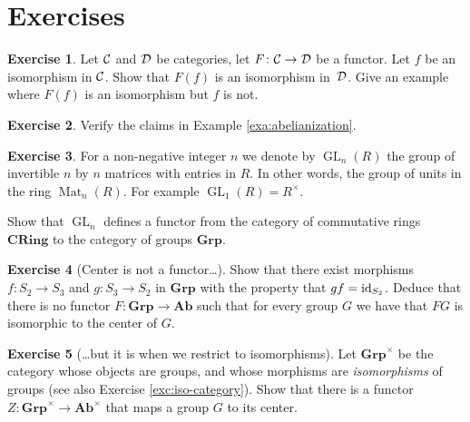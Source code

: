 \documentclass[11pt]{amsbook}
\DeclareMathOperator\GL{GL}
\DeclareMathOperator\Mat{Mat}
\def\id{{\rm id}}
\def\Ab{\mathbf{Ab}}
\def\Grp{\mathbf{Grp}}
\def\CRing{\mathbf{CRing}}
\theoremstyle{plain}
\theoremstyle{definition}
\newtheorem{exercise}{Exercise}
\begin{document}
\newpage
\section*{Exercises}



\begin{exercise}
Let ${\mathcal{C}}$ and ${\mathcal{D}}$ be categories, let $F\colon {\mathcal{C}} \to {\mathcal{D}}$ be a functor. Let $f$ be an isomorphism in ${\mathcal{C}}$. Show that $F(f)$ is an isomorphism
in~${\mathcal{D}}$.  Give an example where $F(f)$ is an isomorphism but $f$ is not.
\end{exercise}




\begin{exercise}Verify the claims in Example \ref{exa:abelianization}.
\end{exercise}

\begin{exercise}\label{exc:functor-GLn}
For a non-negative integer $n$ we denote by $\GL_n(R)$ the group of invertible $n$ by $n$ matrices with entries in $R$. In other words, the group of units in the ring $\Mat_n(R)$. For example $\GL_1(R) = R^\times$.

Show that $\GL_n$ defines a functor from the category of commutative rings $\CRing$ to the category of groups $\Grp$. 
\end{exercise}


\begin{exercise}[Center is not a functor\ldots]
Show that there exist morphisms $f\colon S_2 \to S_3$ and $g\colon S_3 \to S_2$ in $\Grp$ with the property that $gf=\id_{S_2}$.
Deduce that there is no functor $F\colon \Grp \to \Ab$ such that for every group $G$ we have that $FG$ is isomorphic to the center of $G$.
\end{exercise}

\begin{exercise}[\ldots but it is when we restrict to isomorphisms]
Let $\Grp^\times$ be the category whose objects are groups, and whose morphisms are \emph{isomorphisms} of groups (see also Exercise \ref{exc:iso-category}). Show that there is a functor $Z\colon \Grp^\times \to \Ab^\times$ that maps
a group $G$ to its center.
\end{exercise}
%
\end{document}
